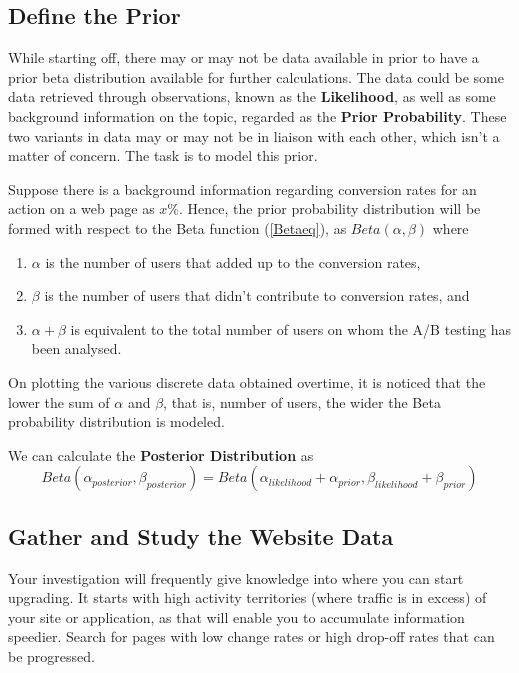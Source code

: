 \subsection{Define the Prior}
While starting off, there may or may not be data available in prior to have a prior beta distribution available for further calculations.
The data could be some data retrieved through observations, known as the \textbf{Likelihood},  as well as some background information on the topic, regarded as the \textbf{Prior Probability}. These two variants in data may or may not be in liaison with each other, which isn't a matter of concern. The task is to model this prior.

Suppose there is a background information regarding conversion rates for an action on a web page as $x\%$. Hence, the prior probability distribution will be formed with respect to the Beta function (\ref{Betaeq}), as $Beta(\alpha,\beta)$ where 
\begin{enumerate}
    \item $\alpha$ is the number of users that added up to the conversion rates,
    \item $\beta$ is the number of users that didn't contribute to conversion rates, and
    \item $\alpha + \beta$ is equivalent to the total number of users on whom the A/B testing has been analysed.
\end{enumerate}

On plotting the various discrete data obtained overtime, it is noticed that the lower the sum of $\alpha$ and $\beta$, that is, number of users, the wider the Beta probability distribution is modeled.

We can calculate the \textbf{Posterior Distribution} as
\begin{equation} \label{Posterior}
Beta(\alpha_{posterior},\beta_{posterior}) = Beta(\alpha_{likelihood}+\alpha_{prior},\beta_{likelihood}+\beta_{prior})
\end{equation}

\subsection{Gather and Study the Website Data}
Your investigation will frequently give knowledge into where you can start upgrading. It starts with high activity territories (where traffic is in excess) of your site or application, as that will enable you to accumulate information speedier. Search for pages with low change rates or high drop-off rates that can be progressed.

